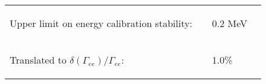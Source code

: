 \begin{slide*}
\begin{minipage}[t]{\linewidth}
\vspace{0.5 cm}
\begin{tabular}{p{0.75\linewidth} p{0.2\linewidth}}
  \begin{minipage}{\linewidth}
    \begin{flushright}
      Upper limit on energy calibration stability:
    \end{flushright}
  \end{minipage} &
  \begin{minipage}{\linewidth}
    \begin{center}
      \huge 0.2 MeV
    \end{center}
  \end{minipage} \\
  \begin{minipage}{\linewidth}
    \begin{flushright}
      Translated to $\delta(\Gamma_{ee})/\Gamma_{ee}$:
    \end{flushright}
  \end{minipage} &
  \begin{minipage}{\linewidth}
    \begin{center}
      \huge 1.0\%
    \end{center}
  \end{minipage} \\
\end{tabular}

\end{minipage}
\end{slide*}


